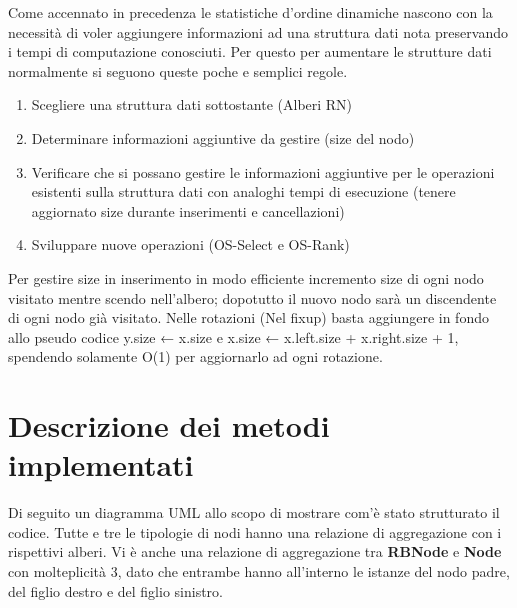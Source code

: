 Come accennato in precedenza le statistiche d'ordine dinamiche nascono con la necessità di voler aggiungere informazioni ad una struttura dati nota preservando i tempi di computazione conosciuti. Per questo per aumentare le strutture dati normalmente si seguono queste poche e semplici regole.
\begin{enumerate}
    \item Scegliere una struttura dati sottostante (Alberi RN)
    \item Determinare informazioni aggiuntive da gestire (size del nodo)
    \item Verificare che si possano gestire le informazioni aggiuntive per le operazioni esistenti sulla struttura dati con analoghi tempi di esecuzione (tenere aggiornato size durante inserimenti e cancellazioni)
    \item Sviluppare nuove operazioni (OS-Select e OS-Rank)
\end{enumerate}

Per gestire size in inserimento in modo efficiente incremento size di ogni nodo visitato mentre scendo nell'albero; dopotutto il nuovo nodo sarà un discendente di ogni nodo già visitato. Nelle rotazioni (Nel fixup) basta aggiungere in fondo allo pseudo codice y.size ← x.size e x.size ← x.left.size + x.right.size + 1, spendendo solamente O(1) per aggiornarlo ad ogni rotazione.

\vspace{0.8cm}

\section{Descrizione dei metodi implementati}
Di seguito un diagramma UML allo scopo di mostrare com'è stato strutturato il codice. Tutte e tre le tipologie di nodi hanno una relazione di aggregazione con i rispettivi alberi. Vi è anche una relazione di aggregazione tra \textbf{RBNode} e \textbf{Node} con molteplicità 3, dato che entrambe hanno all'interno le istanze del nodo padre, del figlio destro e del figlio sinistro.


